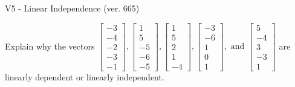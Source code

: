 \begin{exercise}
  \begin{exerciseTitle}V5 - Linear Independence (ver. 665)\end{exerciseTitle}
  \begin{exerciseStatement}
    Explain why the vectors \(\left[\begin{array}{r}
-3 \\
-4 \\
-2 \\
-3 \\
-1
\end{array}\right] , \left[\begin{array}{r}
1 \\
5 \\
-5 \\
-6 \\
-5
\end{array}\right] , \left[\begin{array}{r}
1 \\
5 \\
2 \\
1 \\
-4
\end{array}\right] , \left[\begin{array}{r}
-3 \\
-6 \\
1 \\
0 \\
1
\end{array}\right] , \text{ and } \left[\begin{array}{r}
5 \\
-4 \\
3 \\
-3 \\
1
\end{array}\right]\) are linearly dependent or linearly independent.	



\end{exerciseStatement}
\end{exercise}
